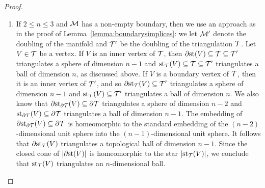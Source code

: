 \documentclass[10pt,a4paper]{article}
\begin{document}
\begin{proof}
\begin{enumerate}
    \item 
    If $2 \leq n \leq 3$ and ${\mathcal M}$ has a non-empty boundary, then we use an approach as in the proof of Lemma~\ref{lemma:boundarysimplices}: 
    we let ${\mathcal M}'$ denote the doubling of the manifold and ${\mathcal T}'$ be the doubling of the triangulation ${\mathcal T}$. 
    Let $V \in {\mathcal T}$ be a vertex. 
    If $V$ is an inner vertex of ${\mathcal T}$, then ${\partial \rm st}(V) \subseteq {\mathcal T} \subseteq {\mathcal T}'$ triangulates a sphere of dimension $n-1$ and $\operatorname{st}_{{\mathcal T}}(V) \subseteq {\mathcal T} \subseteq {\mathcal T}'$ triangulates a ball of dimension $n$, as discussed above. 
    If $V$ is a boundary vertex of ${\mathcal T}$, then it is an inner vertex of ${\mathcal T}'$,
    and so ${\partial \rm st}_{{\mathcal T}}(V) \subseteq {\mathcal T}'$ triangulates a sphere of dimension $n-1$ and $\operatorname{st}_{{\mathcal T}}(V) \subseteq {\mathcal T}'$ triangulates a ball of dimension $n$.
    We also know that ${\partial \rm st}_{\partial{\mathcal T}}(V) \subseteq \partial{\mathcal T}$ triangulates a sphere of dimension $n-2$ and $\operatorname{st}_{\partial{\mathcal T}}(V) \subseteq \partial{\mathcal T}$ triangulates a ball of dimension $n-1$. 
    The embedding of ${\partial \rm st}_{\partial{\mathcal T}}(V) \subseteq \partial{\mathcal T}$ is homeomorphic to the standard embedding of the $(n-2)$-dimensional unit sphere into the $(n-1)$-dimensional unit sphere. 
    It follows that ${\partial \rm st}_{{\mathcal T}}(V)$ triangulates a topological ball of dimension $n-1$.
    Since the closed cone of $\left| {\partial \rm st}(V) \right|$ is homeomorphic to the star $\left| \operatorname{st}_{{\mathcal T}}(V) \right|$, we conclude that $\operatorname{st}_{{\mathcal T}}(V)$ triangulates an $n$-dimensional ball. 
    

\end{enumerate}
\end{proof}
\end{document}
